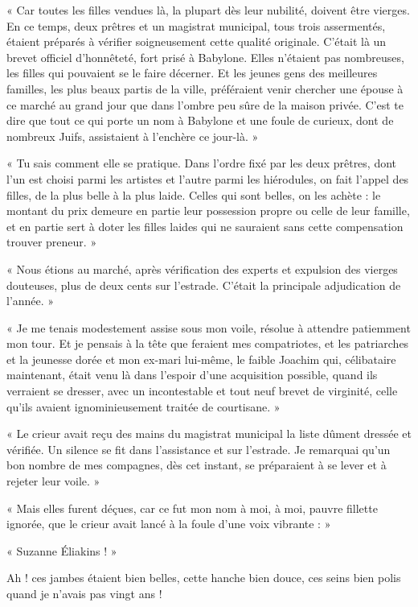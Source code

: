 \documentclass[a4paper, 11pt, oneside, polutonikogreek, french]{article}
\begin{document}
« Car toutes les filles vendues là, la plupart dès leur nubilité, doivent être vierges. En ce temps, deux prêtres et un magistrat municipal, tous trois assermentés, étaient préparés à vérifier soigneusement cette qualité originale. C'était là un brevet officiel d'honnêteté, fort prisé à Babylone. Elles n'étaient pas nombreuses, les filles qui pouvaient se le faire décerner. Et les jeunes gens des meilleures familles, les plus beaux partis de la ville, préféraient venir chercher une épouse à ce marché au grand jour que dans l'ombre peu sûre de la maison privée. C'est te dire que tout ce qui porte un nom à Babylone et une foule de curieux, dont de nombreux Juifs, assistaient à l'enchère ce jour-là. »

« Tu sais comment elle se pratique. Dans l'ordre fixé par les deux prêtres, dont l'un est choisi parmi les artistes et l'autre parmi les hiérodules, on fait l'appel des filles, de la plus belle à la plus laide. Celles qui sont belles, on les achète : le montant du prix demeure en partie leur possession propre ou celle de leur famille, et en partie sert à doter les filles laides qui ne sauraient sans cette compensation trouver preneur. »

« Nous étions au marché, après vérification des experts et expulsion des vierges douteuses, plus de deux cents sur l'estrade. C'était la principale adjudication de l'année. »

« Je me tenais modestement assise sous mon voile, résolue à attendre patiemment mon tour. Et je pensais à la tête que feraient mes compatriotes, et les patriarches et la jeunesse dorée et mon ex-mari lui-même, le faible Joachim qui, célibataire maintenant, était venu là dans l'espoir d'une acquisition possible, quand ils verraient se dresser, avec un incontestable et tout neuf brevet de virginité, celle qu'ils avaient ignominieusement traitée de courtisane. »

« Le crieur avait reçu des mains du magistrat municipal la liste dûment dressée et vérifiée. Un silence se fit dans l'assistance et sur l'estrade. Je remarquai qu'un bon nombre de mes compagnes, dès cet instant, se préparaient à se lever et à rejeter leur voile. »

« Mais elles furent déçues, car ce fut mon nom à moi, à moi, pauvre fillette ignorée, que le crieur avait lancé à la foule d'une voix vibrante : »

« Suzanne Éliakins ! »

Ah ! ces jambes étaient bien belles, cette hanche bien douce, ces seins bien polis quand je n'avais pas vingt ans !
\end{document}
